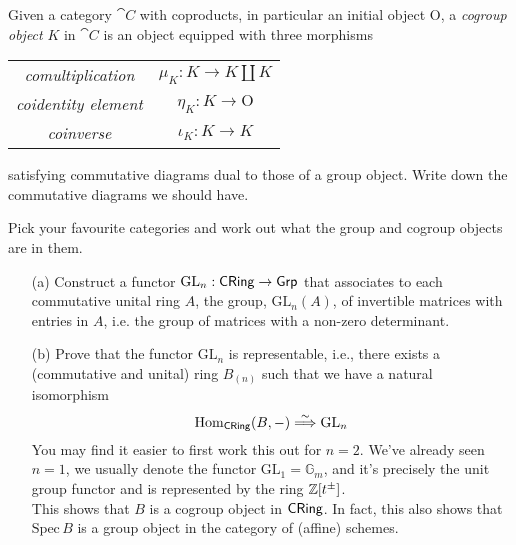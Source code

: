 \vspace*{0.1in}

\begin{problem}\label{prob B.4}
Given a category $\cat{C}$ with coproducts, in particular an initial object $\mathrm{O}$, a \emph{cogroup object} $K$ in $\cat{C}$ is an object equipped with three morphisms
\begin{center}
\begin{tabular}{c c}
\emph{comultiplication} & $\mu_K: K \to K \amalg K$\\[0.5em]
\emph{coidentity element} & $\eta_K: K \to \mathrm{O}$\\[0.5em]
\emph{coinverse} & $\iota_K: K \to K$
\end{tabular}
\end{center}
satisfying commutative diagrams dual to those of a group object. Write down the commutative diagrams we should have.
\end{problem}

\vspace*{0.1in}

\begin{problem}\label{prob B.4a}
Pick your favourite categories and work out what the group and cogroup objects are in them.
\end{problem}

\vspace*{0.1in}

\begin{problem}\label{prob B.5}\hfill
\begin{itemize}
\item[(a)] Construct a functor $\mathrm{GL}_n:\mathsf{CRing} \to \mathsf{Grp}$  that associates to each commutative unital ring $A$, the group, $\mathrm{GL}_n(A)$, of invertible matrices with entries in $A$, i.e. the group of matrices with a non-zero determinant. 
\item[(b)] Prove that the functor $\mathrm{GL}_n$ is representable, i.e., there exists a (commutative and unital) ring $B_{(n)}$ such that we have a natural isomorphism 
\[\mathrm{Hom}_{\mathsf{CRing}}(B,-) \overset{\sim}{\Longrightarrow} \mathrm{GL}_n\] 
You may find it easier to first work this out for $n = 2$. We've already seen $n=1$, we usually denote the functor $\mathrm{GL}_1 = \mathbb{G}_m$, and it's precisely the unit group functor and is represented by the ring $\mathbb Z[t^{\pm}]$.\\[0.5em]
This shows that $B$ is a cogroup object in $\mathsf{CRing}$. In fact, this also shows that $\mathrm{Spec}\,B$ is a group object in the category of (affine) schemes.
\end{itemize}
\end{problem}


